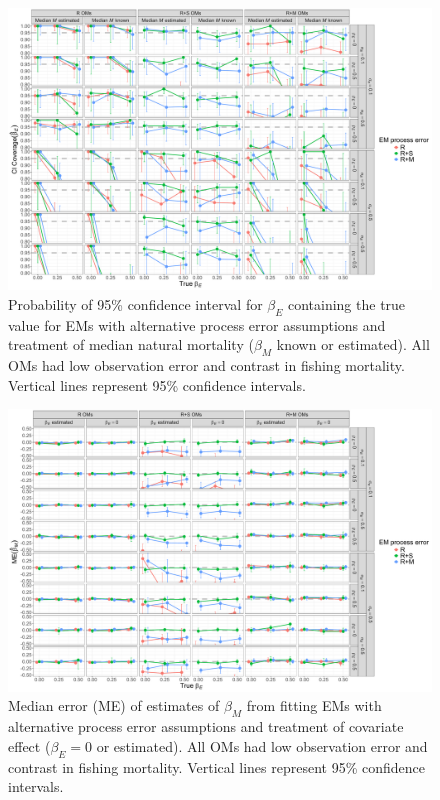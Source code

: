 \documentclass[
  12pt,
]{article}
\begin{document}
\begin{landscape}
\begin{figure}
\begin{center}
\includegraphics[height = \textheight]{beta_E_CI_coverage_main}
\end{center}
\caption{Probability of 95\% confidence interval for $\beta_E$ containing the true value for EMs with alternative process error assumptions and treatment of median natural mortality ($\beta_M$ known or estimated). All OMs had low observation error and contrast in fishing mortality. Vertical lines represent 95\% confidence intervals.}\label{beta_E_CI_coverage}
\end{figure}
\end{landscape}

\begin{landscape}
\begin{figure}
\begin{center}
\includegraphics[height = \textheight]{beta_M_bias_main}
\end{center}
\caption{Median error (ME) of estimates of $\beta_M$ from fitting EMs with alternative process error assumptions and treatment of covariate effect ($\beta_E = 0$ or estimated). All OMs had low observation error and contrast in fishing mortality. Vertical lines represent 95\% confidence intervals.}\label{beta_M_bias}
\end{figure}
\end{landscape}
\end{document}
